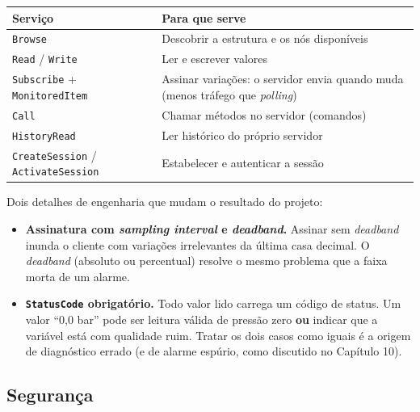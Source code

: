 \begin{longtable}[]{@{}
  >{\raggedright\arraybackslash}p{}
  >{\raggedright\arraybackslash}p{}@{}}
\toprule\noalign{}
\begin{minipage}[b]{\linewidth}\raggedright
Serviço
\end{minipage} & \begin{minipage}[b]{\linewidth}\raggedright
Para que serve
\end{minipage} \\
\midrule\noalign{}
\endhead
\bottomrule\noalign{}
\endlastfoot
\passthrough{\lstinline!Browse!} & Descobrir a estrutura e os nós disponíveis \\
\passthrough{\lstinline!Read!} / \passthrough{\lstinline!Write!} & Ler e escrever valores \\
\passthrough{\lstinline!Subscribe!} + \passthrough{\lstinline!MonitoredItem!} & Assinar variações: o servidor envia quando muda (menos tráfego que \emph{polling}) \\
\passthrough{\lstinline!Call!} & Chamar métodos no servidor (comandos) \\
\passthrough{\lstinline!HistoryRead!} & Ler histórico do próprio servidor \\
\passthrough{\lstinline!CreateSession!} / \passthrough{\lstinline!ActivateSession!} & Estabelecer e autenticar a sessão \\
\end{longtable}

Dois detalhes de engenharia que mudam o resultado do projeto:

\begin{itemize}
\tightlist
\item
  \textbf{Assinatura com \emph{sampling interval} e \emph{deadband}.} Assinar sem \emph{deadband} inunda o cliente com variações irrelevantes da última casa decimal. O \emph{deadband} (absoluto ou percentual) resolve o mesmo problema que a faixa morta de um alarme.
\item
  \textbf{\passthrough{\lstinline!StatusCode!} obrigatório.} Todo valor lido carrega um código de status. Um valor ``0,0 bar'' pode ser leitura válida de pressão zero \textbf{ou} indicar que a variável está com qualidade ruim. Tratar os dois casos como iguais é a origem de diagnóstico errado (e de alarme espúrio, como discutido no Capítulo 10).
\end{itemize}

\subsection{Segurança}\label{seguranuxe7a}

